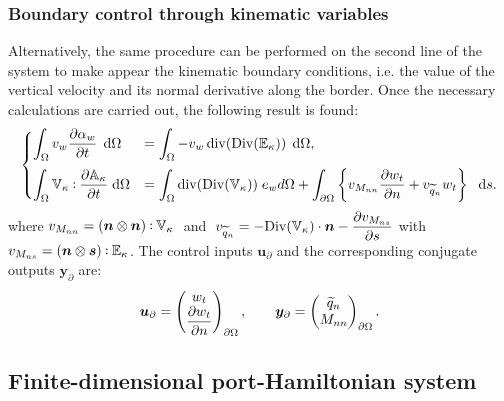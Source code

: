 \documentclass[11pt]{article}
\def\onedot{$\mathsurround0pt\ldotp$}
\def\cddot{%
	\mathbin{\vcenter{\baselineskip.67ex
			\hbox{\onedot}\hbox{\onedot}}%
}}
\begin{document}
	
	\subsubsection{Boundary control through kinematic variables}
	\label{sec:BC_displ}
	Alternatively, the same procedure can be performed on the second line of the system to make appear the kinematic boundary conditions, i.e. the value of the vertical velocity and its normal derivative along the border. Once the necessary calculations are carried out, the following result is found: 
	\begin{equation}
	\label{eq:WF_Kir_Kin}
	\begin{cases}
	\displaystyle\int_{\Omega} v_w \diffp{\alpha_w}{t} \, \d\Omega &=  \displaystyle\int_{\Omega} -v_w \, \mathrm{div}(\mathrm{Div}(\mathbb{E}_{\kappa})) \,  \d\Omega, \vspace{2mm}\\
	\displaystyle\int_{\Omega} \mathbb{V}_{\kappa} \cddot \diffp{\mathbb{A}_{\kappa}}{t}   \d\Omega &= \displaystyle\int_{\Omega} \mathrm{div}(\mathrm{Div}(\mathbb{V}_{\kappa})) \; e_w  d\Omega +  \displaystyle\int_{\partial \Omega} \left\{ {v}_{M_{nn}} \diffp{w_t}{n}  + v_{\widetilde{q}_n} w_t \right\} \  \d{s}. 
	\end{cases}
	\end{equation}
	where $v_{M_{nn}} = \left(\bm{n} \otimes \bm{n} \right) \cddot \mathbb{V}_{\kappa}  \; $ and $ \; v_{\widetilde{q}_n} = - \displaystyle \mathrm{Div}(\mathbb{V}_{\kappa}) \cdot \bm{n} - \diffp{ v_{M_{ns}} }{s}$ with $v_{M_{ns}} = \left(\bm{n} \otimes \bm{s} \right) \cddot \mathbb{E}_{\kappa}$. The control inputs $\bm{u}_\partial$ and the corresponding conjugate outputs $\bm{y}_\partial$ are: 
	\[\bm{u}_\partial = 
	\begin{pmatrix}
	w_t \\
	\displaystyle \diffp{w_t}{n} \\
	\end{pmatrix}_{\partial \Omega}, \qquad
	\bm{y}_\partial = 
	\begin{pmatrix}
	\widetilde{q}_n \\
	M_{nn} \\
	\end{pmatrix}_{\partial \Omega}.
	\]
	
	\subsection{Finite-dimensional port-Hamiltonian system}
	
\end{document}
